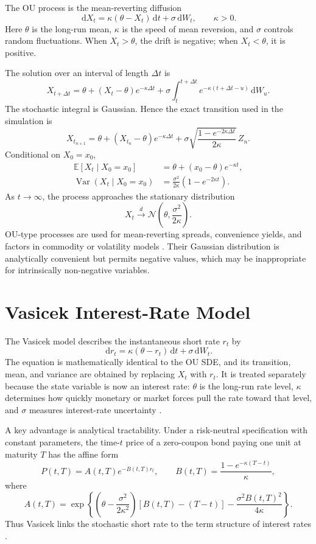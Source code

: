 \documentclass[11pt,a4paper]{article}
\newcommand{\E}{\mathbb{E}}
\newcommand{\Var}{\operatorname{Var}}
\newcommand{\dd}{\,\mathrm{d}}
\newcommand{\Normal}{\mathcal{N}}
\begin{document}
The OU process is the mean-reverting diffusion
\[
  \dd X_t=\kappa(\theta-X_t)\dd t+\sigma\dd W_t,
  \qquad \kappa>0.
\]
Here $\theta$ is the long-run mean, $\kappa$ is the speed of mean reversion, and $\sigma$ controls random fluctuations. When $X_t>\theta$, the drift is negative; when $X_t<\theta$, it is positive.

The solution over an interval of length $\Delta t$ is
\[
  X_{t+\Delta t}=\theta+(X_t-\theta)e^{-\kappa\Delta t}
  +\sigma\int_t^{t+\Delta t}e^{-\kappa(t+\Delta t-u)}\dd W_u.
\]
The stochastic integral is Gaussian. Hence the exact transition used in the simulation is
\[
  X_{t_{n+1}}=\theta+(X_{t_n}-\theta)e^{-\kappa\Delta t}
  +\sigma\sqrt{\frac{1-e^{-2\kappa\Delta t}}{2\kappa}}\,Z_n.
\]
Conditional on $X_0=x_0$,
\begin{align*}
  \E[X_t\mid X_0=x_0]&=\theta+(x_0-\theta)e^{-\kappa t},\\
  \Var(X_t\mid X_0=x_0)&=\frac{\sigma^2}{2\kappa}\left(1-e^{-2\kappa t}\right).
\end{align*}
As $t\to\infty$, the process approaches the stationary distribution
\[
  X_t\overset{d}{\longrightarrow}\Normal\left(\theta,\frac{\sigma^2}{2\kappa}\right).
\]
OU-type processes are used for mean-reverting spreads, convenience yields, and factors in commodity or volatility models \cite{ou}. Their Gaussian distribution is analytically convenient but permits negative values, which may be inappropriate for intrinsically non-negative variables.

\section{Vasicek Interest-Rate Model}

The Vasicek model describes the instantaneous short rate $r_t$ by
\[
  \dd r_t=\kappa(\theta-r_t)\dd t+\sigma\dd W_t.
\]
The equation is mathematically identical to the OU SDE, and its transition, mean, and variance are obtained by replacing $X_t$ with $r_t$. It is treated separately because the state variable is now an interest rate: $\theta$ is the long-run rate level, $\kappa$ determines how quickly monetary or market forces pull the rate toward that level, and $\sigma$ measures interest-rate uncertainty \cite{vasicek}.

A key advantage is analytical tractability. Under a risk-neutral specification with constant parameters, the time-$t$ price of a zero-coupon bond paying one unit at maturity $T$ has the affine form
\[
  P(t,T)=A(t,T)e^{-B(t,T)r_t},
  \qquad B(t,T)=\frac{1-e^{-\kappa(T-t)}}{\kappa},
\]
where
\[
  A(t,T)=\exp\left\{\left(\theta-\frac{\sigma^2}{2\kappa^2}\right)
  \left[B(t,T)-(T-t)\right]-\frac{\sigma^2B(t,T)^2}{4\kappa}\right\}.
\]
Thus Vasicek links the stochastic short rate to the term structure of interest rates \cite{vasicek,hull}.
\end{document}
